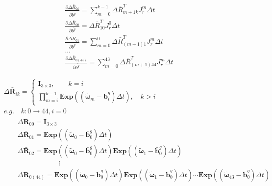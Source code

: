 \documentclass{article}
\begin{document}
\begin{CJK*}{GBK}{song}
\begin{equation}\left.\begin{aligned}
\frac{\partial{\Delta \bar{R}_{0k}}}{\partial{\bar{b^g}}} = \sum_{m=0}^{k-1}\Delta \bar{R}_{m+1k}^{T}J^{m}_r\Delta{t}
\\
\frac{\partial{\Delta \bar{R}_{00}}}{\partial{\bar{b^g}}} = \Delta \bar{R}_{10}^{T}J^{0}_r\Delta{t}
\\
\frac{\partial{\Delta \bar{R}_{01}}}{\partial{\bar{b^g}}} = \sum_{m=0}^{0}\Delta \bar{R}_{(m+1)1}^{T}J^{m}_r\Delta{t}
\\
\ldots
\\
\frac{\partial{\Delta \bar{R}_{0(44)}}}{\partial{\bar{b^g}}} = \sum_{m=0}^{43}\Delta \bar{R}_{(m+1)44}^{T}J^{m}_r\Delta{t}
\end{aligned}\tag{2.2}\right.\end{equation}

\begin{equation}\left.\begin{aligned}&
\Delta \bar{\mathbf{R}}_{ik} =
\left\{
\begin{aligned}
\mathbf{I}_{3\times{3}},\qquad k=i
\\
\prod_{m=i}^{k-1} \mathbf{Exp}((\tilde{\boldsymbol{\omega}}_m - \bar{\mathbf{b}}_i^{g})\Delta{t}) ,\quad k>i
\end{aligned}
\right.
\\&
e.g. \quad k:0\rightarrow{44},i=0
\\&
\qquad \Delta \bar{\mathbf{R}}_{00} = \mathbf{I}_{3\times{3}}
\\&
\qquad \Delta \bar{\mathbf{R}}_{01} = \mathbf{Exp}((\tilde{\boldsymbol{\omega}}_{0} - \bar{\mathbf{b}}_0^{g})\Delta{t})
\\&
\qquad \Delta \bar{\mathbf{R}}_{02} = \mathbf{Exp}((\tilde{\boldsymbol{\omega}}_{0} - \bar{\mathbf{b}}_0^{g})\Delta{t})
                                        \mathbf{Exp}((\tilde{\boldsymbol{\omega}}_{1} - \bar{\mathbf{b}}_0^{g})\Delta{t})
\\&
\qquad \qquad \qquad \qquad \vdots
\\&
\qquad \Delta \bar{\mathbf{R}}_{0(44)} = \mathbf{Exp}((\tilde{\boldsymbol{\omega}}_0 - \bar{\mathbf{b}}_0^{g})\Delta{t})
\mathbf{Exp}((\tilde{\boldsymbol{\omega}}_1 - \bar{\mathbf{b}}_0^{g})\Delta{t})\cdots
\mathbf{Exp}((\tilde{\boldsymbol{\omega}}_{43} - \bar{\mathbf{b}}_0^{g})\Delta{t})
\end{aligned}\tag{2.2}\right.\end{equation}


\end{CJK*}
\end{document}
